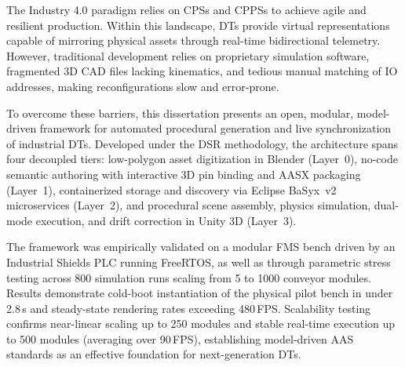 
%

The Industry 4.0 paradigm relies on \glspl{CPS} and \glspl{CPPS} to achieve agile and resilient production. Within this landscape, \glspl{DT} provide virtual representations capable of mirroring physical assets through real-time bidirectional telemetry. However, traditional development relies on proprietary simulation software, fragmented 3D \gls{CAD} files lacking kinematics, and tedious manual matching of \gls{IO} addresses, making reconfigurations slow and error-prone.

To overcome these barriers, this dissertation presents an open, modular, model-driven framework for automated procedural generation and live synchronization of industrial \glspl{DT}. Developed under the \gls{DSR} methodology, the architecture spans four decoupled tiers: low-polygon asset digitization in Blender (Layer~0), no-code semantic authoring with interactive 3D pin binding and \gls{AASX} packaging (Layer~1), containerized storage and discovery via Eclipse BaSyx~v2 microservices (Layer~2), and procedural scene assembly, physics simulation, dual-mode execution, and drift correction in Unity 3D (Layer~3).

The framework was empirically validated on a modular \gls{FMS} bench driven by an Industrial Shields \gls{PLC} running FreeRTOS, as well as through parametric stress testing across 800 simulation runs scaling from 5 to 1000 conveyor modules. Results demonstrate cold-boot instantiation of the physical pilot bench in under 2.8\,s and steady-state rendering rates exceeding 480\,\gls{FPS}. Scalability testing confirms near-linear scaling up to 250 modules and stable real-time execution up to 500 modules (averaging over 90\,\gls{FPS}), establishing model-driven \gls{AAS} standards as an effective foundation for next-generation \glspl{DT}.

